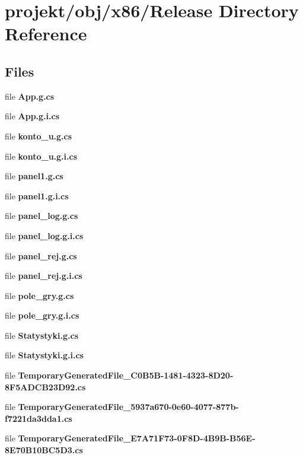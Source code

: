 \section{projekt/obj/x86/\+Release Directory Reference}
\label{dir_7c67f2ac14fdc4ba8bcaab0efa7b9004}
\subsection*{Files}
\begin{DoxyCompactItemize}
\item 
file \textbf{ App.\+g.\+cs}
\item 
file \textbf{ App.\+g.\+i.\+cs}
\item 
file \textbf{ konto\+\_\+u.\+g.\+cs}
\item 
file \textbf{ konto\+\_\+u.\+g.\+i.\+cs}
\item 
file \textbf{ panel1.\+g.\+cs}
\item 
file \textbf{ panel1.\+g.\+i.\+cs}
\item 
file \textbf{ panel\+\_\+log.\+g.\+cs}
\item 
file \textbf{ panel\+\_\+log.\+g.\+i.\+cs}
\item 
file \textbf{ panel\+\_\+rej.\+g.\+cs}
\item 
file \textbf{ panel\+\_\+rej.\+g.\+i.\+cs}
\item 
file \textbf{ pole\+\_\+gry.\+g.\+cs}
\item 
file \textbf{ pole\+\_\+gry.\+g.\+i.\+cs}
\item 
file \textbf{ Statystyki.\+g.\+cs}
\item 
file \textbf{ Statystyki.\+g.\+i.\+cs}
\item 
file \textbf{ Temporary\+Generated\+File\+\_\+C0\+B5\+B-\/1481-\/4323-\/8\+D20-\/8\+F5\+A\+D\+C\+B23\+D92.\+cs}
\item 
file \textbf{ Temporary\+Generated\+File\+\_\+5937a670-\/0e60-\/4077-\/877b-\/f7221da3dda1.\+cs}
\item 
file \textbf{ Temporary\+Generated\+File\+\_\+\+E7\+A71\+F73-\/0\+F8\+D-\/4\+B9\+B-\/\+B56\+E-\/8\+E70\+B10\+B\+C5\+D3.\+cs}
\end{DoxyCompactItemize}
